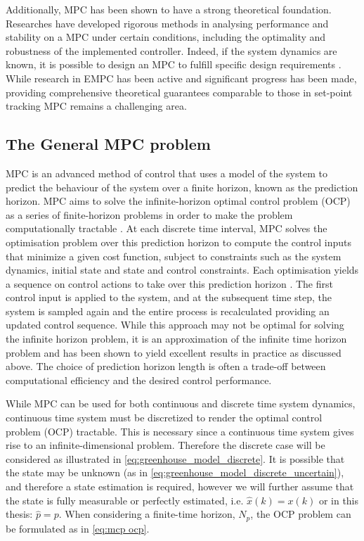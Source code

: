 Additionally, MPC has been shown to have a strong theoretical foundation. Researches have developed rigorous methods in analysing performance and stability on a MPC under certain conditions, including the optimality and robustness of the implemented controller. Indeed, if the system dynamics are known, it is possible to design an MPC to fulfill specific design requirements \cite{rawlingsModelPredictiveControl2017}. While research in EMPC has been active and significant progress has been made, providing comprehensive theoretical guarantees comparable to those in set-point tracking MPC remains a challenging area.

\subsection {The General MPC problem}\label{ssection:general-mpc}
MPC is an advanced method of control that uses a model of the system to predict the behaviour of the system over a finite horizon, known as the prediction horizon. MPC aims to solve the infinite-horizon optimal control problem (OCP) as a series of finite-horizon problems in order to make the problem computationally tractable \cite{beckenbachAddressingInfinitehorizonOptimization2018}. At each discrete time interval, MPC solves the optimisation problem over this prediction horizon to compute the control inputs that minimize a given cost function, subject to constraints such as the system dynamics, initial state and state and control constraints. Each optimisation yields a sequence on control actions to take over this prediction horizon . The first control input is applied to the system, and at the subsequent time step, the system is sampled again and the entire process is recalculated providing an updated control sequence. While this approach may not be optimal for solving the infinite horizon problem, it is an approximation of the infinite time horizon problem and has been shown to yield excellent results in practice as discussed above. The choice of prediction horizon length is often a trade-off between computational efficiency and the desired control performance. 

While MPC can be used for both continuous and discrete time system dynamics,  continuous time system must be discretized to render the optimal control problem (OCP) tractable. This is necessary since a continuous time system gives rise to an infinite-dimensional problem. Therefore the discrete case will be considered as illustrated in \autoref{eq:greenhouse_model_discrete}.
It is possible that the state may be unknown (as in \autoref{eq:greenhouse_model_discrete_uncertain}), and therefore a state estimation is required, however we will further assume that the state is fully measurable or perfectly estimated, i.e. $\hat x(k) = x(k)$ or in this thesis: $\hat{p} = p$. When considering a finite-time horizon, $N_p$, the OCP problem can be formulated as in \autoref{eq:mcp ocp}.

